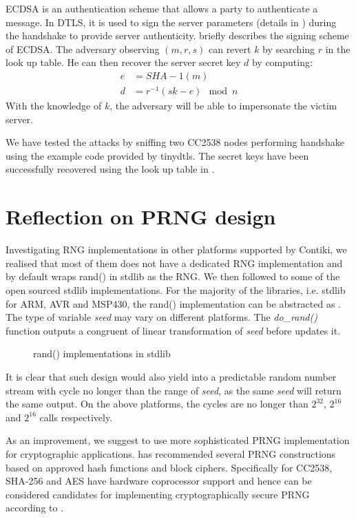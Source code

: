 \begin{itemize}
	ECDSA is an authentication scheme that allows a party to authenticate a message. In DTLS, it is used to sign the server parameters (details in \cite{rfc3279}) during the handshake to provide server authenticity.  briefly describes the signing scheme of ECDSA. The adversary observing $(m,r,s)$ can revert $k$ by searching $r$ in the look up table. He can then recover the server secret key $d$ by computing:
	\begin{equation}
		\begin{aligned}
		e &= SHA-1(m) \\
		d &= r^{-1}(sk - e) \mod n
		\end{aligned}
	\end{equation}
	With the knowledge of $k$, the adversary will be able to impersonate the victim server.
\end{itemize}

We have tested the attacks by sniffing two CC2538 nodes performing handshake using the example code provided by tinydtls. The secret keys have been successfully recovered using the look up table in \cite{prngtest}.

\section{Reflection on PRNG design}
Investigating RNG implementations in other platforms supported by Contiki, we realised that most of them does not have a dedicated RNG implementation and by default wraps rand() in stdlib as the RNG. We then followed to some of the open sourced stdlib implementations. For the majority of the libraries, i.e. stdlib for ARM\cite{ARMrand}, AVR\cite{AVRrand} and MSP430\cite{MSP430rand}, the rand() implementation can be abstracted as . The type of variable \textit{seed}  may vary on different platforms. The \textit{do\_rand()} function outputs a congruent of linear transformation of \textit{seed} before updates it.
 
\begin{figure}

\caption{rand() implementations in stdlib}
\label{rand}
\end{figure}

It is clear that such design would also yield into a predictable random number stream with cycle no longer than the range of \textit{seed}, as the same \textit{seed} will return the same output. On the above platforms, the cycles are no longer than $2^{32}$, $2^{16}$ and $2^{16}$ calls respectively.

As an improvement, we suggest to use more sophisticated PRNG implementation for cryptographic applications. \cite{NISTPRNG} has recommended several PRNG constructions based on approved hash functions and block ciphers. Specifically for CC2538, SHA-256 and AES have hardware coprocessor support and hence can be considered candidates for implementing cryptographically secure PRNG according to \cite{NISTPRNG}.

